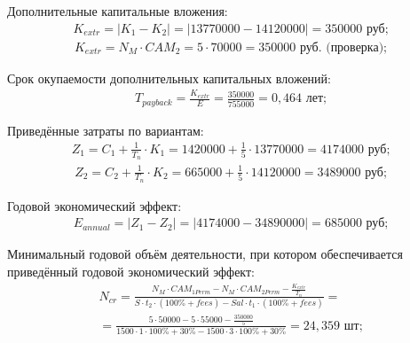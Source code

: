 Дополнительные капитальные вложения:
\begin{equation}
	\begin{aligned}
		K_{extr}=|K_1-K_2|=|13770000-14120000|=350 000 \text{ руб;}
	\end{aligned}
\end{equation}
\begin{equation}
	\begin{aligned}
		K_{extr}=N_M \cdot {CAM}_2=5 \cdot 70000=350 000 \text{ руб. (проверка);}
	\end{aligned}
\end{equation}

Срок окупаемости дополнительных капитальных вложений:
\begin{equation}
	\begin{aligned}
		T_{payback}=\frac{K_{extr}}{E}=\frac{350000}{755000}=0,464 \text{ лет;}
	\end{aligned}
\end{equation}

Приведённые затраты по вариантам:
\begin{equation}
	\begin{aligned}
		Z_1=C_1+\frac{1}{T_n} \cdot K_1=1420000+\frac{1}{5} \cdot 13770000=4 174 000 \text{ руб;}
	\end{aligned}
	\label{F:spends1}
\end{equation}
\begin{equation}
	\begin{aligned}
		Z_2=C_2+\frac{1}{T_n} \cdot K_2=665000+\frac{1}{5} \cdot 14120000=3489000 \text{ руб;}
	\end{aligned}
	\label{F:spends2}
\end{equation}

Годовой экономический эффект:
\begin{equation}
	\begin{aligned}
		E_{annual}=|Z_1-Z_2|=|4174000-34890000|=685000 \text{ руб;}
	\end{aligned}
\end{equation}

Минимальный годовой объём деятельности, при котором обеспечивается приведённый годовой экономический эффект:
\begin{equation}
	\begin{aligned}
		N_{cr}=\frac{N_M \cdot CAM_{1Perm}-N_M \cdot CAM_{2Perm}-\frac{K_{extr}}{T_n}}{S \cdot t_2 \cdot (100\%+fees)-Sal \cdot t_1 \cdot (100\%+fees)}=\\=\frac{5 \cdot 50000-5 \cdot 55000-\frac{350000}{5}}{1500 \cdot 1 \cdot 100\%+30\%-1500 \cdot 3 \cdot 100\%+30\%}=24,359 \text{ шт;}
	\end{aligned}
\end{equation}

